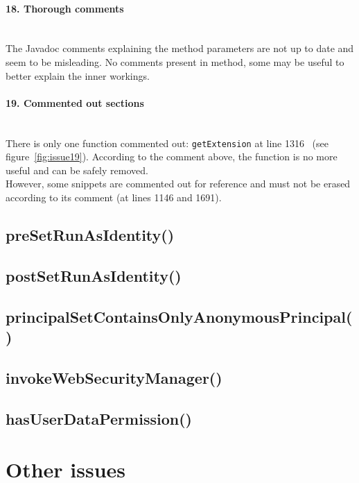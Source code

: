 \documentclass[english]{article}
\newcommand{\code}[1]{\texttt{#1}}
\newcommand{\issue}[3][?]{
    \paragraph{#1. #2} \mbox{}\\ #3
}
\begin{document}
\issue[18]{Thorough comments} {
The Javadoc comments explaining the method parameters are not up to date and seem to be misleading. No comments present in method, some may be useful to better explain the inner workings.
}

\issue[19]{Commented out sections} {
    There is only one function commented out: \code{getExtension} at line 1316 \
    (see figure~\ref{fig:issue19}).
    According to the comment above, the function is no more useful and can 
    be safely removed.  \\
    However, some snippets are commented out for reference and must not be 
    erased according to its comment (at lines 1146 and 1691). 
}



\subsection{preSetRunAsIdentity()}
\subsection{postSetRunAsIdentity()}
\subsection{principalSetContainsOnlyAnonymousPrincipal()}
\subsection{invokeWebSecurityManager()}
\subsection{hasUserDataPermission()}




\section{Other issues}
\end{document}

